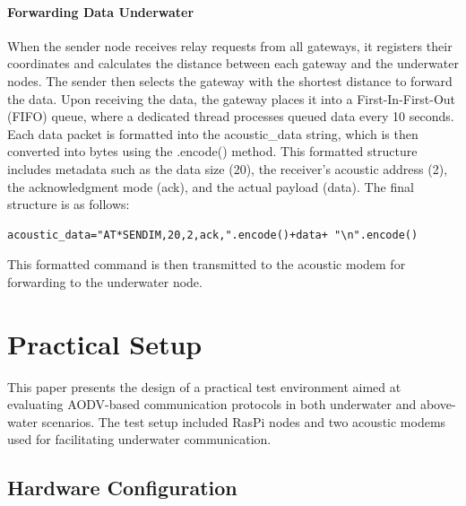 \documentclass[]{nsm-thesis}
\begin{document}
\subsubsection{Forwarding Data Underwater}
When the sender node receives relay requests from all gateways, it registers their coordinates and calculates the distance between each gateway and the underwater nodes. The sender then selects the gateway with the shortest distance to forward the data. Upon receiving the data, the gateway places it into a First-In-First-Out (FIFO) queue, where a dedicated thread processes queued data every 10 seconds. Each data packet is formatted into the acoustic\_data string, which is then converted into bytes using the .encode() method. This formatted structure includes metadata such as the data size (20), the receiver's acoustic address (2), the acknowledgment mode (ack), and the actual payload (data). The final structure is as follows: 
\begin{lstlisting}
acoustic_data="AT*SENDIM,20,2,ack,".encode()+data+ "\n".encode()
\end{lstlisting}
This formatted command is then transmitted to the acoustic modem for forwarding to the underwater node.





\chapter{Practical Setup}
This paper presents the design of a practical test environment aimed at evaluating AODV-based communication protocols in both underwater and above-water scenarios. The test setup included RasPi nodes and two acoustic modems used for facilitating underwater communication.
\section{Hardware Configuration}
\end{document}
